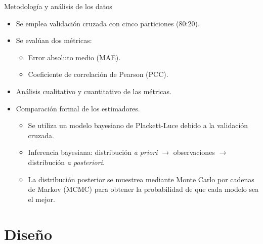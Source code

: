 \documentclass[aspectratio=169]{beamer}
\begin{document}
\begin{frame}{Metodología y análisis de los datos}


        \begin{itemize}%
        \item Se emplea validación cruzada con cinco particiones (80:20). 
        \item Se evalúan dos métricas:
        
        \begin{itemize}
            \small
            \item Error absoluto medio (MAE).
            \item Coeficiente de correlación de Pearson (PCC).
        \end{itemize}
        \item Análisis cualitativo y cuantitativo de las métricas.
        \item Comparación formal de los estimadores.
       
            \begin{itemize}
                 \small
                \item Se utiliza un modelo bayesiano de Plackett-Luce \cite{calvo2018bayesian} debido a la validación cruzada.
                \item Inferencia bayesiana: distribución \textit{a priori} $\rightarrow$ observaciones $\rightarrow$ distribución \textit{a posteriori}.
                \item La distribución posterior se muestrea mediante Monte Carlo por cadenas de Markov (MCMC) para obtener la probabilidad de que cada modelo sea el mejor.
            \end{itemize}
   
        \end{itemize}

\end{frame}


\section{Diseño}  

\begin{frame}{}
\end{frame}
\end{document}
